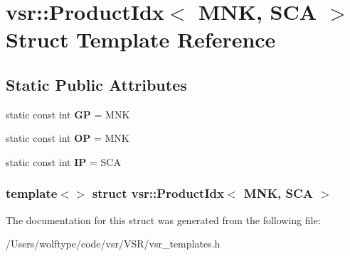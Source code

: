 \hypertarget{structvsr_1_1_product_idx_3_01_m_n_k_00_01_s_c_a_01_4}{\section{vsr\-:\-:Product\-Idx$<$ M\-N\-K, S\-C\-A $>$ Struct Template Reference}
\label{structvsr_1_1_product_idx_3_01_m_n_k_00_01_s_c_a_01_4}
}
\subsection*{Static Public Attributes}
\begin{DoxyCompactItemize}
\item 
\hypertarget{structvsr_1_1_product_idx_3_01_m_n_k_00_01_s_c_a_01_4_a7138ec9f2e122b212ff09fe301392487}{static const int {\bfseries G\-P} = M\-N\-K}\label{structvsr_1_1_product_idx_3_01_m_n_k_00_01_s_c_a_01_4_a7138ec9f2e122b212ff09fe301392487}

\item 
\hypertarget{structvsr_1_1_product_idx_3_01_m_n_k_00_01_s_c_a_01_4_afb3f2566ef2196b737608a54fc8a49a0}{static const int {\bfseries O\-P} = M\-N\-K}\label{structvsr_1_1_product_idx_3_01_m_n_k_00_01_s_c_a_01_4_afb3f2566ef2196b737608a54fc8a49a0}

\item 
\hypertarget{structvsr_1_1_product_idx_3_01_m_n_k_00_01_s_c_a_01_4_aa6650f2f160545a6422634d2a9ef7686}{static const int {\bfseries I\-P} = S\-C\-A}\label{structvsr_1_1_product_idx_3_01_m_n_k_00_01_s_c_a_01_4_aa6650f2f160545a6422634d2a9ef7686}

\end{DoxyCompactItemize}
\subsubsection*{template$<$$>$ struct vsr\-::\-Product\-Idx$<$ M\-N\-K, S\-C\-A $>$}



The documentation for this struct was generated from the following file\-:\begin{DoxyCompactItemize}
\item 
/\-Users/wolftype/code/vsr/\-V\-S\-R/vsr\-\_\-templates.\-h\end{DoxyCompactItemize}
